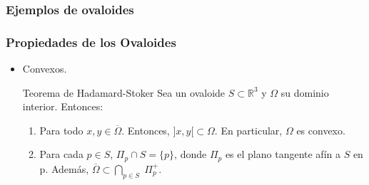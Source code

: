 \documentclass{beamer}
\begin{document}
	\begin{frame}
		\frametitle{Ejemplos de ovaloides}
		\begin{figure}[h]
		\end{figure}
	\end{frame}
	
	\begin{frame}
		\frametitle{Propiedades de los Ovaloides}
		\begin{itemize}
			\item Convexos.
			\begin{block}{Teorema de Hadamard-Stoker}
				Sea un ovaloide $S \subset \mathbb{R}^3$ y $\Omega$ su dominio interior. Entonces:
				
				\begin{enumerate}
					\item Para todo $x, y \in \overline{\Omega}$. Entonces, $]x, y[ \subset \Omega$. En particular, $\Omega$ es convexo.
					\item Para cada $p \in S$, $\Pi_p \cap S = \{p\}$, donde $\Pi_p$ es el plano tangente afín a $S$ en p. Además, $\overline{\Omega} \subset \bigcap_{p \in S} \; \Pi^{+}_{p}$.
				\end{enumerate}
			\end{block}
		\end{itemize}
		

		${ }$\\
	\end{frame}
	
\end{document}
